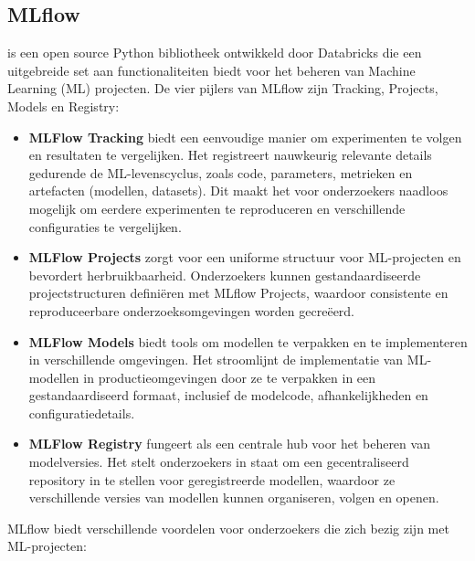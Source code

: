 \subsection{MLflow}
\label{subsec:mlflow}

\textcite{MLflow2023} is een open source Python bibliotheek ontwikkeld door Databricks die een uitgebreide set aan functionaliteiten biedt voor het beheren van Machine Learning (ML) projecten. De vier pijlers van MLflow zijn Tracking, Projects, Models en Registry:

\begin{itemize}
    \item \textbf{MLFlow Tracking} biedt een eenvoudige manier om experimenten te volgen en resultaten te vergelijken. Het registreert nauwkeurig relevante details gedurende de ML-levenscyclus, zoals code, parameters, metrieken en artefacten (modellen, datasets). Dit maakt het voor onderzoekers naadloos mogelijk om eerdere experimenten te reproduceren en verschillende configuraties te vergelijken.
    \item \textbf{MLFlow Projects} zorgt voor een uniforme structuur voor ML-projecten en bevordert herbruikbaarheid. Onderzoekers kunnen gestandaardiseerde projectstructuren definiëren met MLflow Projects, waardoor consistente en reproduceerbare onderzoeksomgevingen worden gecreëerd.
    \item \textbf{MLFlow Models} biedt tools om modellen te verpakken en te implementeren in verschillende omgevingen. Het stroomlijnt de implementatie van ML-modellen in productieomgevingen door ze te verpakken in een gestandaardiseerd formaat, inclusief de modelcode, afhankelijkheden en configuratiedetails.
    \item \textbf{MLFlow Registry} fungeert als een centrale hub voor het beheren van modelversies. Het stelt onderzoekers in staat om een gecentraliseerd repository in te stellen voor geregistreerde modellen, waardoor ze verschillende versies van modellen kunnen organiseren, volgen en openen.
\end{itemize}

MLflow biedt verschillende voordelen voor onderzoekers die zich bezig zijn met ML-projecten:

